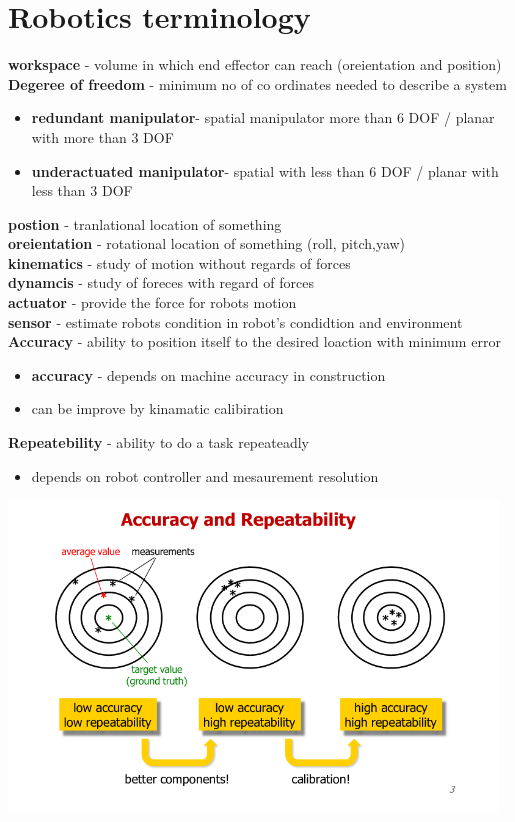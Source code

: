 \documentclass{article}
\begin{document}
\section{Robotics terminology}
\textbf{workspace} - volume in which end effector can reach (oreientation and position)
\textbf{Degeree of freedom} - minimum no of co ordinates needed to describe a system
\begin{itemize}
	\item \textbf{redundant manipulator}- spatial manipulator more than 6 DOF / planar with more than 3 DOF
	\item \textbf{underactuated manipulator}- spatial with less than 6 DOF / planar with less than 3 DOF
\end{itemize}
\textbf{postion} - tranlational location of something \\
\textbf{oreientation} - rotational location of something (roll, pitch,yaw) \\
\textbf {kinematics} - study of motion without regards of forces \\
\textbf{dynamcis} - study of foreces with regard of forces \\
\textbf{actuator} - provide the force for robots motion \\
\textbf{sensor} - estimate robots condition in robot's condidtion and environment \\
\textbf{Accuracy} - ability to position itself to the desired loaction with minimum error
\begin{itemize}
	\item  \textbf{accuracy} - depends on machine accuracy in construction
	\item can be improve by kinamatic calibiration
\end{itemize}
\textbf{Repeatebility} - ability to do a task repeateadly\\
\begin{itemize}
	\item depends on robot controller and mesaurement resolution
\end{itemize}
\includegraphics[width=13cm]{accuracy.png}
\end{document}
